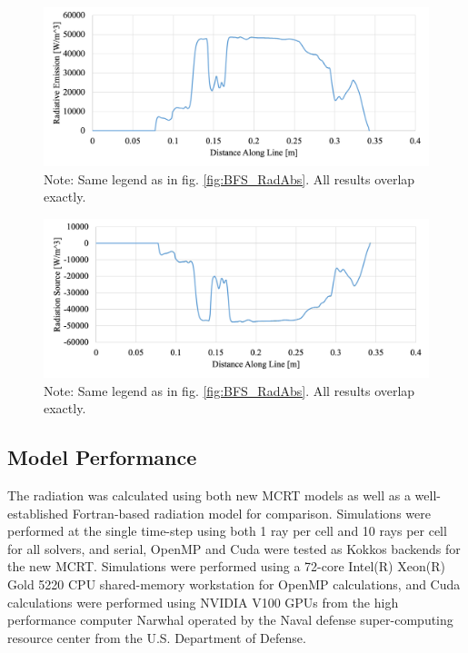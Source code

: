 \begin{figure}[!ht]
\includegraphics[width=\linewidth]{figures/ch4/LineComparison_RadEmi.png}
\caption{Note: Same legend as in fig. \ref{fig:BFS_RadAbs}. All results overlap exactly.}
\label{fig:BFS_RadEmi}
\end{figure}

\begin{figure}[!ht]
\includegraphics[width=\linewidth]{figures/ch4/LineComparison_RadSrc.png}
\caption{Note: Same legend as in fig. \ref{fig:BFS_RadAbs}. All results overlap exactly.}
\label{fig:BFS_RadSrc}
\end{figure}


\subsection{Model Performance}
The radiation was calculated using both new MCRT models as well as a well-established Fortran-based radiation model for comparison. Simulations were performed at the single time-step using both 1 ray per cell and 10 rays per cell for all solvers, and serial, OpenMP and Cuda were tested as Kokkos backends for the new MCRT. 
Simulations were performed using a 72-core Intel(R) Xeon(R) Gold 5220 CPU shared-memory workstation for OpenMP calculations, and Cuda calculations were performed using NVIDIA V100 GPUs from the high performance computer Narwhal operated by the Naval defense super-computing resource center from the U.S. Department of Defense.

